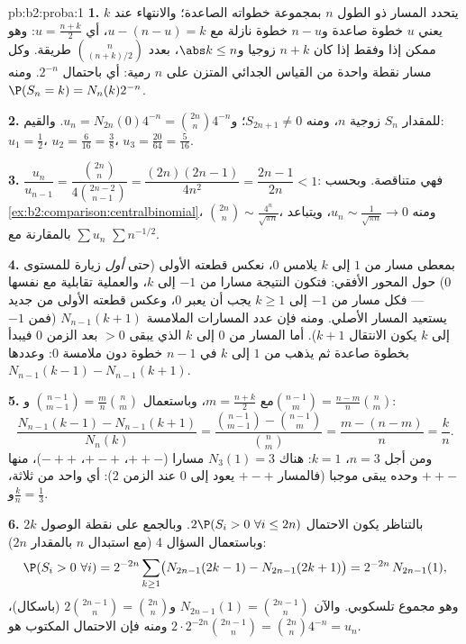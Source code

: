 \begin{solution}{pb:b2:proba:1}
\textbf{1.} يتحدد المسار ذو الطول $n$ بمجموعة خطواته الصاعدة؛
والانتهاء عند $k$ يعني $u$ خطوة صاعدة و$n - u$ خطوة نازلة مع
$u - (n - u) = k$، أي $u = \frac{n+k}2$: وهو ممكن إذا وفقط إذا كان $n + k$ زوجيا و$\abs k \leq n$،
بعدد $\binom{n}{(n+k)/2}$ طريقة. وكل مسار  نقطة واحدة من القياس الجدائي المتزن
على $n$ رمية: أي باحتمال $2^{-n}$. ومنه $\P(S_n = k) = N_n(k)2^{-n}$.

\textbf{2.} للمقدار $S_n$ زوجية $n$، ومنه $S_{2n+1} \neq
0$؛ و$u_n = N_{2n}(0)4^{-n} = \binom{2n}n4^{-n}$.
والقيم: $u_1 = \frac12$، $u_2 = \frac6{16} = \frac38$، $u_3 =
\frac{20}{64} = \frac5{16}$.

\textbf{3.} $\dfrac{u_n}{u_{n-1}} =
\dfrac{\binom{2n}n}{4\binom{2n-2}{n-1}} =
\dfrac{(2n)(2n-1)}{4n^2} = \dfrac{2n-1}{2n} < 1$: فهي متناقصة. وبحسب \cref{ex:b2:comparison:centralbinomial}، $\binom{2n}n \sim
\frac{4^n}{\sqrt{\pi n}}$، ومنه $u_n \sim \frac1{\sqrt{\pi n}}
\to 0$،
ويتباعد $\sum u_n$ بالمقارنة مع $\sum
n^{-1/2}$.

\textbf{4.} بمعطى مسار من $1$ إلى $k$ يلامس $0$، نعكس
قطعته الأولى (حتى \emph{أول} زيارة للمستوى $0$) حول المحور
الأفقي: فتكون النتيجة مسارا من $-1$ إلى $k$، والعملية تقابلية
مع نفسها --- فكل مسار من $-1$ إلى $k \geq 1$ يجب أن يعبر $0$،
وعكس قطعته الأولى من جديد يستعيد المسار الأصلي. ومنه فإن عدد المسارات
الملامسة $N_{n-1}(k + 1)$ (فمن $-1$ إلى $k$ يكون الانتقال $k + 1$). أما
المسار من $0$ إلى $k$ الذي يبقى $>
0$ بعد الزمن $0$
فيبدأ بخطوة صاعدة ثم يذهب من $1$ إلى $k$ في $n - 1$ خطوة دون
ملامسة $0$: وعددها $N_{n-1}(k-1) - N_{n-1}(k+1)$.

\textbf{5.} مع $m = \frac{n+k}2$، وباستعمال $\binom{n-1}{m-1} = \frac mn\binom nm$ و$\binom{n-1}{m} =
\frac{n-m}n\binom nm$:
\[
\frac{N_{n-1}(k-1) - N_{n-1}(k+1)}{N_n(k)}
= \frac{\binom{n-1}{m-1} - \binom{n-1}{m}}{\binom nm}
= \frac{m - (n - m)}{n} = \frac kn .
\]
ومن أجل $n = 3$، $k = 1$: هناك $N_3(1) = 3$ مسارا ($++-$، $+-+$،
$-++$)، منها $++-$ وحده يبقى موجبا (فالمسار $+-+$ يعود إلى
$0$ عند الزمن $2$): أي واحد من ثلاثة، و$\frac kn = \frac13$.

\textbf{6.} بالتناظر يكون الاحتمال $2\P(S_i > 0\ \forall
i \leq 2n)$. وبالجمع على نقطة الوصول
$2k$ وباستعمال السؤال 4 (مع استبدال $n$ بالمقدار $2n$):
\[
\P(S_i > 0\ \forall i) = 2^{-2n}\sum_{k\geq1}
\bigl(N_{2n-1}(2k-1) - N_{2n-1}(2k+1)\bigr)
= 2^{-2n}\,N_{2n-1}(1),
\]
وهو مجموع تلسكوبي. والآن $N_{2n-1}(1) = \binom{2n-1}{n}$ و$2\binom{2n-1}n = \binom{2n}n$ (باسكال)، ومنه فإن الاحتمال
المكتوب هو $2\cdot2^{-2n}\binom{2n-1}n =
\binom{2n}n4^{-n} = u_n$.


\end{solution}
